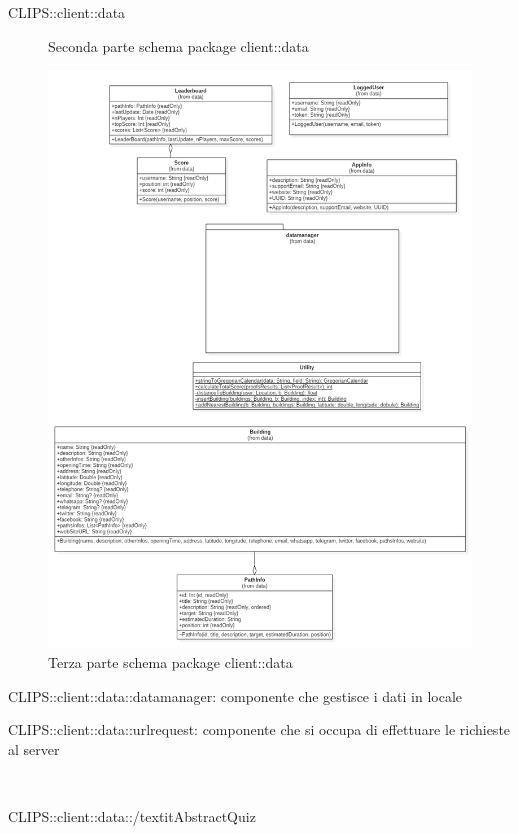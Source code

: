 \begin{componente}{CLIPS::client::data}
\begin{figure}[h!]
	\caption{Seconda parte schema package client::data}
\end{figure}
\begin{figure}[h!]
	\centering
	\includegraphics[scale=0.4]{img/package/png/client--data3.png}
	\caption{Terza parte schema package client::data}
\end{figure}
\begin{compPackageContenuti}
\item CLIPS::client::data::datamanager: componente che gestisce i dati in locale
\item CLIPS::client::data::urlrequest: componente che si occupa di effettuare le richieste al server
\end{compPackageContenuti}
\begin{compClassi} \\ 
\begin{classe}{CLIPS::client::data::/textit{AbstractQuiz}}


\end{classe}
\end{compClassi}
\end{componente}
